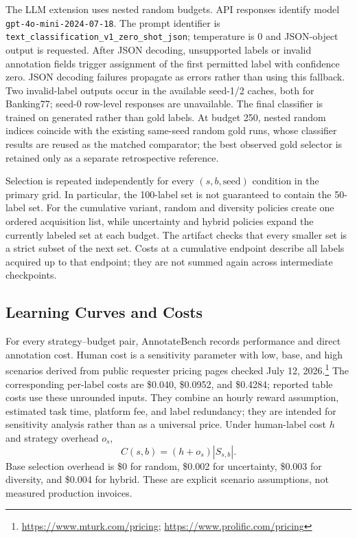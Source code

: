 \documentclass[conference]{IEEEtran}
\begin{document}
\begingroup\raggedright The LLM extension uses nested random budgets. API responses identify model \texttt{gpt-4o-mini-2024-07-18}. The prompt identifier is \texttt{text\_classification\_v1\_zero\_shot\_json}; temperature is 0 and JSON-object output is requested. After JSON decoding, unsupported labels or invalid annotation fields trigger assignment of the first permitted label with confidence zero. JSON decoding failures propagate as errors rather than using this fallback. Two invalid-label outputs occur in the available seed-1/2 caches, both for Banking77; seed-0 row-level responses are unavailable. The final classifier is trained on generated rather than gold labels. At budget 250, nested random indices coincide with the existing same-seed random gold runs, whose classifier results are reused as the matched comparator; the best observed gold selector is retained only as a separate retrospective reference.\par\endgroup

Selection is repeated independently for every $(s,b,\mathrm{seed})$ condition in the primary grid. In particular, the 100-label set is not guaranteed to contain the 50-label set. For the cumulative variant, random and diversity policies create one ordered acquisition list, while uncertainty and hybrid policies expand the currently labeled set at each budget. The artifact checks that every smaller set is a strict subset of the next set. Costs at a cumulative endpoint describe all labels acquired up to that endpoint; they are not summed again across intermediate checkpoints.

\subsection{Learning Curves and Costs}
For every strategy--budget pair, AnnotateBench records performance and direct annotation cost. Human cost is a sensitivity parameter with low, base, and high scenarios derived from public requester pricing pages checked July 12, 2026.\footnote{\url{https://www.mturk.com/pricing}; \url{https://www.prolific.com/pricing}} The corresponding per-label costs are \$0.040, \$0.0952, and \$0.4284; reported table costs use these unrounded inputs. They combine an hourly reward assumption, estimated task time, platform fee, and label redundancy; they are intended for sensitivity analysis rather than as a universal price. Under human-label cost $h$ and strategy overhead $o_s$,
\begin{equation}
C(s,b)=(h+o_s)|S_{s,b}|.
\end{equation}
Base selection overhead is \$0 for random, \$0.002 for uncertainty, \$0.003 for diversity, and \$0.004 for hybrid. These are explicit scenario assumptions, not measured production invoices.
\end{document}
